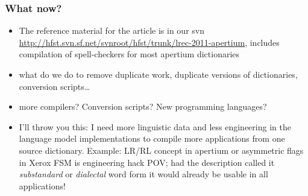 \documentclass{beamer}
\begin{document}
\begin{frame}
    \frametitle{What now?}
    \begin{itemize}
        \item The reference material for the article is in our svn
            \url{http://hfst.svn.sf.net/svnroot/hfst/trunk/lrec-2011-apertium},
            includes compilation of spell-checkers for most apertium
            dictionaries
        \item what do we do to remove duplicate work, duplicate versions of
            dictionaries, conversion scripts\ldots
        \item more compilers? Conversion scripts? New programming languages?
        \item I'll throw you this: I need more linguistic data and less
            engineering in the language model implementations to compile
            more applications from one source dictionary. Example: LR/RL concept
            in apertium or asymmetric flags in Xerox FSM is engineering hack 
            POV; had the description
            called it \emph{substandard} or \emph{dialectal} word form it would
            already be usable in all applications!
    \end{itemize}
\end{frame}
\end{document}
